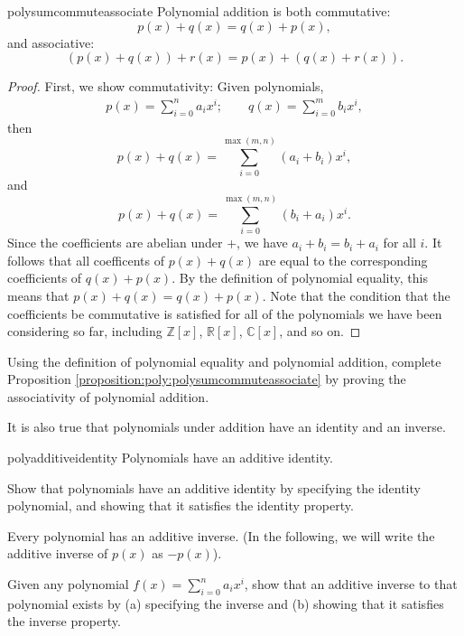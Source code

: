 \begin {prop}{polysumcommuteassociate} Polynomial addition is both commutative: 
	\[p(x)+q(x) = q(x) + p(x),\]	
and associative:	
	\[(p(x) + q(x)) + r(x)  = p(x) + (q(x) + r(x)).\]	
\end {prop}
\begin {proof}{}
First, we show commutativity:	
Given polynomials,
\begin{align*}
p(x)  = \sum^{n}_{i=0} a_i x^i; \qquad
q(x)  = \sum^{m}_{i=0} b_i x^i,
\end{align*}	
then 
\[
p(x) + q(x) =  \sum_{i=0}^{\max(m,n)} (a_i + b_i) x^i,
\]
and
\[
p(x) + q(x) =  \sum_{i=0}^{\max(m,n)} (b_i + a_i) x^i.
\]
Since the coefficients are abelian under +, we have $a_i + b_i = b_i + a_i$ for all $i$. It follows that all coefficents of $p(x) + q(x)$ are equal to the corresponding coefficients of $q(x) + p(x)$. By the definition of polynomial equality, this means that 
$p(x) + q(x) = q(x) + p(x)$.  Note that the condition that the coefficients be commutative is satisfied for all of the polynomials we have been considering so far, including $\mathbb{Z}[x]$, $\mathbb{R}[x]$, $\mathbb{C}[x]$, and so on.

\end {proof}

\begin {exercise}{}
Using the definition of polynomial equality and polynomial addition, complete Proposition \ref{proposition:poly:polysumcommuteassociate} by proving the associativity of polynomial addition.
\end {exercise}

It is also true that polynomials under addition have an identity and an inverse.

\begin {prop}{polyadditiveidentity} Polynomials have an additive identity.
\end{prop}
\begin{exercise}
Show that polynomials have an additive identity by specifying the identity polynomial, and showing that it satisfies the identity property.
\end{exercise}

\begin{prop}\label{proposition:poly:polyadditiveinverse} Every polynomial has an additive inverse.  (In the following, we will write the additive inverse of $p(x)$ as $-p(x)$).
\end{prop}
\begin{exercise}
Given any polynomial $f(x) = \sum_{i=0}^{n} a_i x^i$, show that an additive inverse to that polynomial exists by (a) specifying the inverse and (b) showing that it satisfies the inverse property.
\end{exercise}

